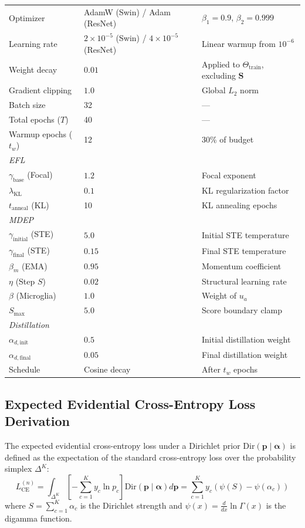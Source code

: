 \documentclass[letterpaper]{article} %
\newcommand{\Dir}{\text{Dir}}
\begin{document}
\begin{table}[t]
\begin{tabular}{@{}lll@{}}
Optimizer & AdamW (Swin) / Adam (ResNet)~\cite{loshchilov2019decoupled, kingma2015adam} & $\beta_1=0.9$, $\beta_2=0.999$ \\
Learning rate & $2 \times 10^{-5}$ (Swin) / $4 \times 10^{-5}$ (ResNet) & Linear warmup from $10^{-6}$ \\
Weight decay & $0.01$ & Applied to $\Theta_{\text{train}}$, excluding $\bm{S}$ \\
Gradient clipping & $1.0$ & Global $L_2$ norm \\
Batch size & 32 & --- \\
Total epochs ($T$) & 40 & --- \\
Warmup epochs ($t_w$) & 12 & 30\% of budget \\
\midrule
\multicolumn{3}{l}{\emph{EFL}} \\
$\gamma_{\text{base}}$ (Focal) & $1.2$ & Focal exponent \\
$\lambda_{\text{KL}}$ & $0.1$ & KL regularization factor \\
$t_{\text{anneal}}$ (KL) & 10 & KL annealing epochs \\
\midrule
\multicolumn{3}{l}{\emph{MDEP}} \\
$\gamma_{\text{initial}}$ (STE) & $5.0$ & Initial STE temperature \\
$\gamma_{\text{final}}$ (STE) & $0.15$ & Final STE temperature \\
$\beta_m$ (EMA) & $0.95$ & Momentum coefficient \\
$\eta$ (Step $S$) & $0.02$ & Structural learning rate \\
$\beta$ (Microglia) & $1.0$ & Weight of $u_a$ \\
$S_{\max}$ & $5.0$ & Score boundary clamp \\
\midrule
\multicolumn{3}{l}{\emph{Distillation}} \\
$\alpha_{d,\text{init}}$ & $0.5$ & Initial distillation weight \\
$\alpha_{d,\text{final}}$ & $0.05$ & Final distillation weight \\
Schedule & Cosine decay & After $t_w$ epochs \\
\bottomrule
\end{tabular}
\end{table}


\subsection{Expected Evidential Cross-Entropy Loss Derivation}
The expected evidential cross-entropy loss under a Dirichlet prior $\Dir(\bm{p} \mid \bm{\alpha})$ is defined as the expectation of the standard cross-entropy loss over the probability simplex $\Delta^K$:
\begin{equation}
    L_{\text{CE}}^{(n)} = \int_{\Delta^K} \left[ -\sum_{c=1}^K y_c \ln p_c \right] \Dir(\bm{p} \mid \bm{\alpha}) d\bm{p} = \sum_{c=1}^K y_c \left( \psi(S) - \psi(\alpha_c) \right)
\end{equation}
where $S = \sum_{c=1}^K \alpha_c$ is the Dirichlet strength and $\psi(x) = \frac{d}{dx} \ln \Gamma(x)$ is the digamma function.
\end{document}
